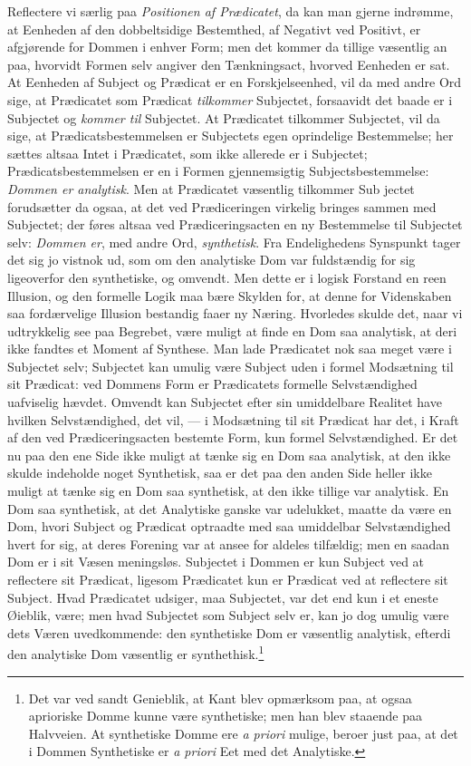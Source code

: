 \documentclass[12pt]{book}
\newcommand{\opage}[1]{\marginnote{\footnotesize\textit{[#1]}}}
\begin{document}
Reflectere vi særlig paa \emph{Positionen af Prædicatet}, da kan man gjerne indrømme, at Eenheden af den dobbeltsidige Bestemthed, af Negativt ved Positivt, er afgjørende for Dommen i enhver Form; men det kommer da tillige væsentlig an paa, hvorvidt Formen selv angiver den Tænkningsact, hvorved Eenheden er sat. At Eenheden af Subject og Prædicat er en Forskjelseenhed, vil da med andre Ord sige, at Prædicatet som Prædicat \emph{tilkommer} Subjectet, forsaavidt det baade er i Subjectet og \emph{kommer til} Subjectet. At Prædicatet tilkommer Subjectet, vil da sige, at Prædicatsbestemmelsen er Subjectets egen oprindelige Bestemmelse; her sættes altsaa Intet i Prædicatet, som ikke allerede er i Subjectet; Prædicatsbestemmelsen er en i Formen gjennemsigtig Subjectsbestemmelse: \emph{Dommen er analytisk}. Men at Prædicatet væsentlig tilkommer Sub%
\opage{57}jectet forudsætter da ogsaa, at det ved Prædiceringen virkelig bringes sammen med Subjectet; der føres altsaa ved Prædiceringsacten en ny Bestemmelse til Subjectet selv: \emph{Dommen er}, med andre Ord, \emph{synthetisk}. Fra Endelighedens Synspunkt tager det sig jo vistnok ud, som om den analytiske Dom var fuldstændig for sig ligeoverfor den synthetiske, og omvendt. Men dette er i logisk Forstand en reen Illusion, og den formelle Logik maa bære Skylden for, at denne for Videnskaben saa fordærvelige Illusion bestandig faaer ny Næring. Hvorledes skulde det, naar vi udtrykkelig see paa Begrebet, være muligt at finde en Dom saa analytisk, at deri ikke fandtes et Moment af Synthese. Man lade Prædicatet nok saa meget være i Subjectet selv; Subjectet kan umulig være Subject uden i formel Modsætning til sit Prædicat: ved Dommens Form er Prædicatets formelle Selvstændighed uafviselig hævdet. Omvendt kan Subjectet efter sin umiddelbare Realitet have hvilken Selvstændighed, det vil, --- i Modsætning til sit Prædicat har det, i Kraft af den ved Prædiceringsacten bestemte Form, kun formel Selvstændighed. Er det nu paa den ene Side ikke muligt at tænke sig en Dom saa analytisk, at den ikke skulde indeholde noget Synthetisk, saa er det paa den anden Side heller ikke muligt at tænke sig en Dom saa synthetisk, at den ikke tillige var analytisk. En Dom saa synthetisk, at det Analytiske ganske var udelukket, maatte da være en Dom, hvori Subject og Prædicat optraadte med saa umiddelbar Selvstændighed hvert for sig, at deres Forening var at ansee for aldeles tilfældig; men en saadan Dom er i sit Væsen meningsløs. Subjectet i Dommen er kun Subject ved at reflectere sit Prædicat, ligesom Prædicatet kun er Prædicat ved at reflectere sit Subject. Hvad Prædicatet udsiger, maa Subjectet, var det end kun i et eneste Øieblik, være; men hvad Subjectet som Subject selv er, kan jo dog umulig være dets Væren uvedkommende: den synthetiske Dom er væsentlig %
\opage{58}analytisk, efterdi den analytiske Dom væsentlig er synthethisk.\footnote{Det var ved sandt Genieblik, at Kant blev opmærksom paa, at ogsaa aprioriske Domme kunne være synthetiske; men han blev staaende paa Halvveien. At synthetiske Domme ere \textit{a priori} mulige, beroer just paa, at det i Dommen Synthetiske er \textit{a priori} Eet med det Analytiske.}%
\end{document}
